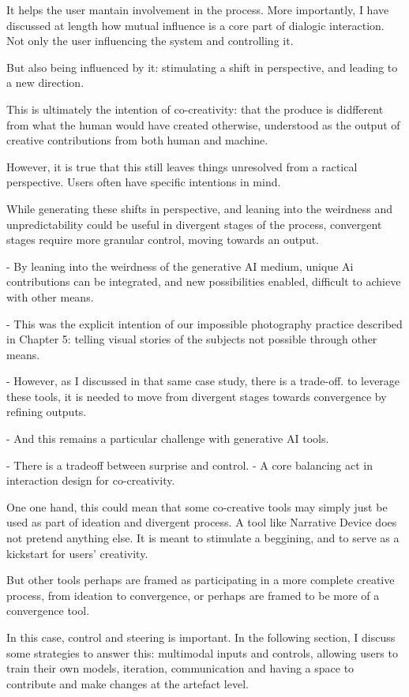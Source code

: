It helps the user mantain involvement in the process. 
More importantly, I have discussed at length how mutual influence is a core part of dialogic interaction. Not only the user influencing the system and controlling it. 

But also being influenced by it: stimulating a shift in perspective, and leading to a new direction. 

This is ultimately the intention of co-creativity: that the produce is didfferent from what the human would have created otherwise, understood as the output of creative contributions from both human and machine. 

However, it is true that this still leaves things unresolved from a ractical perspective. Users often have specific intentions in mind. 

While generating these shifts in perspective, and leaning into the weirdness and unpredictability could be useful in divergent stages of the process, convergent stages require more granular control, moving towards an output. 

- By leaning into the weirdness of the generative AI medium, unique Ai contributions can be integrated, and new possibilities enabled, difficult to achieve with other means. 

- This was the explicit intention of our impossible photography practice described in Chapter 5: telling visual stories of the subjects not possible through other means. 

- However, as I discussed in that same case study, there is a trade-off. to leverage these tools, it is needed to move from divergent stages towards convergence by refining outputs. 

- And this remains a particular challenge with generative AI tools. 

- There is a tradeoff between surprise and control. 
- A core balancing act in interaction design for co-creativity. 

One one hand, this could mean that some co-creative tools may simply just be used as part of ideation and divergent process. A tool like Narrative Device does not pretend anything else. It is meant to stimulate a beggining, and to serve as a kickstart for users' creativity. 

But other tools perhaps are framed as participating in a more complete creative process, from ideation to convergence, or perhaps are framed to be more of a convergence tool. 

In this case, control and steering is important. In the following section, I discuss some strategies to answer this: multimodal inputs and controls, allowing users to train their own models, iteration, communication and having a space to contribute and make changes at the artefact level. 


